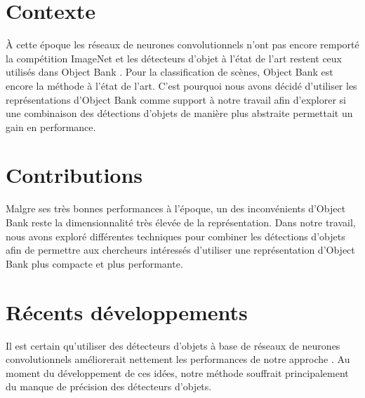 \section{Contexte}

\`{A} cette \'{e}poque les r\'{e}seaux de neurones convolutionnels n'ont pas
encore remport\'{e} la comp\'{e}tition ImageNet \citep{Krizhevsky-2012-small} et les
d\'{e}tecteurs d'objet \`{a} l'\'{e}tat de l'art restent ceux utilisés dans
Object Bank \citep{lsvm-pami}. Pour la classification de sc\`{e}nes, Object
Bank est encore la m\'{e}thode \`{a} l'\'{e}tat de l'art.  C'est pourquoi nous
avons d\'{e}cid\'{e} d'utiliser les repr\'{e}sentations d'Object Bank comme
support \`{a} notre travail afin d'explorer si une combinaison des
d\'{e}tections d'objets de mani\`{e}re plus abstraite permettait un gain en
performance.

\section{Contributions}

Malgre ses tr\`{e}s bonnes performances \`{a} l'\'{e}poque, un des
inconv\'{e}nients d'Object Bank reste la dimensionnalit\'{e} tr\`{e}s
\'{e}lev\'{e}e de la repr\'{e}sentation.  Dans notre travail, nous avons
explor\'{e} diff\'{e}rentes techniques pour combiner les d\'{e}tections
d'objets afin de permettre aux chercheurs int\'{e}ress\'{e}s d'utiliser une
repr\'{e}sentation d'Object Bank plus compacte et plus performante.


\section{R\'{e}cents d\'{e}veloppements}

Il est certain qu'utiliser des d\'{e}tecteurs d'objets \`{a} base de
r\'{e}seaux de neurones convolutionnels am\'{e}liorerait nettement les
performances de notre approche \citep{Scene-14}.  Au moment du
d\'{e}veloppement de ces id\'{e}es, notre m\'{e}thode souffrait principalement
du manque de pr\'{e}cision des d\'{e}tecteurs d'objets. 
